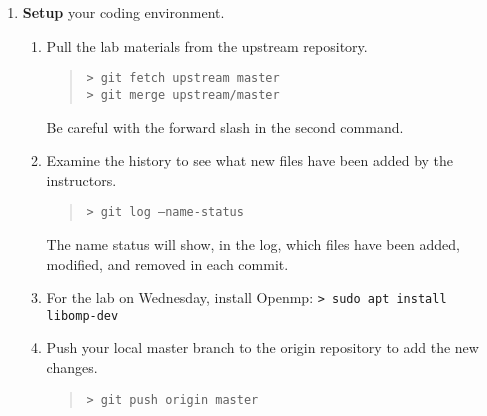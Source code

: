 \documentclass[letter]{article}
\begin{document}
\begin{enumerate}

    \item \textbf{Setup} your coding environment.
        \begin{enumerate}
            \item Pull the lab materials from the upstream repository.
                \begin{quote}
                    \texttt{> git fetch upstream master}\\
                    \texttt{> git merge upstream/master}
                \end{quote}
                Be careful with the forward slash in the second command.
            \item Examine the history to see what new files have been added by the instructors.  
                \begin{quote}
                    \texttt{> git log --name-status}
                \end{quote}
            The name status will show, in the log, which files have been added, modified, and removed in each commit.
            \item For the lab on Wednesday, install Openmp: \texttt{> sudo apt install libomp-dev}
            \item Push your local master branch to the origin repository to add the new changes.
                \begin{quote}
                    \texttt{> git push origin master}
                \end{quote}
        \end{enumerate}


\end{enumerate}
\end{document}
